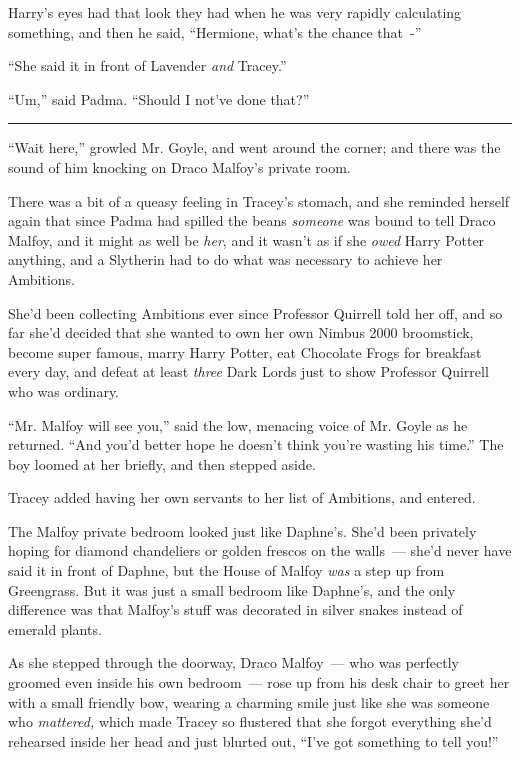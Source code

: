 Harry's eyes had that look they had when he was very rapidly calculating something, and then he said, ``Hermione, what's the chance that~-''

``She said it in front of Lavender \emph{and} Tracey.''

``Um,'' said Padma. ``Should I not've done that?''

\begin{center}\rule{3in}{0.4pt}\end{center}

``Wait here,'' growled Mr. Goyle, and went around the corner; and there was the sound of him knocking on Draco Malfoy's private room.

There was a bit of a queasy feeling in Tracey's stomach, and she reminded herself again that since Padma had spilled the beans \emph{someone} was bound to tell Draco Malfoy, and it might as well be \emph{her}, and it wasn't as if she \emph{owed} Harry Potter anything, and a Slytherin had to do what was necessary to achieve her Ambitions.

She'd been collecting Ambitions ever since Professor Quirrell told her off, and so far she'd decided that she wanted to own her own Nimbus 2000 broomstick, become super famous, marry Harry Potter, eat Chocolate Frogs for breakfast every day, and defeat at least \emph{three} Dark Lords just to show Professor Quirrell who was ordinary.

``Mr. Malfoy will see you,'' said the low, menacing voice of Mr. Goyle as he returned. ``And you'd better hope he doesn't think you're wasting his time.'' The boy loomed at her briefly, and then stepped aside.

Tracey added having her own servants to her list of Ambitions, and entered.

The Malfoy private bedroom looked just like Daphne's. She'd been privately hoping for diamond chandeliers or golden frescos on the walls~--- she'd never have said it in front of Daphne, but the House of Malfoy \emph{was} a step up from Greengrass. But it was just a small bedroom like Daphne's, and the only difference was that Malfoy's stuff was decorated in silver snakes instead of emerald plants.

As she stepped through the doorway, Draco Malfoy~--- who was perfectly groomed even inside his own bedroom~--- rose up from his desk chair to greet her with a small friendly bow, wearing a charming smile just like she was someone who \emph{mattered,} which made Tracey so flustered that she forgot everything she'd rehearsed inside her head and just blurted out, ``I've got something to tell you!''

